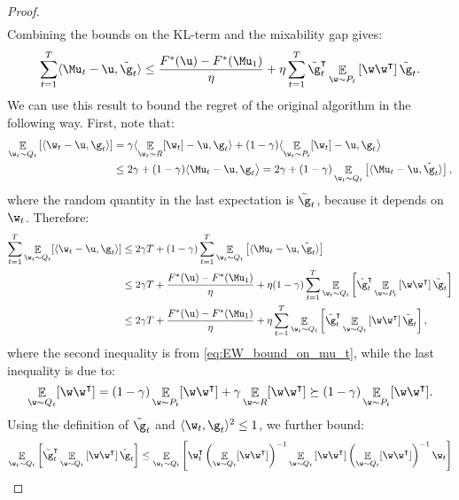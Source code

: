 \documentclass{colt2018} %
\DeclareMathOperator*{\E}{\mathbb{E}}
\renewcommand{\top}{\intercal}
\newcommand{\inner}[2]{\langle #1, #2 \rangle}  %
\begin{document}
\begin{proof}
\begin{align*}
\end{align*}
Combining the bounds on the KL-term and the mixability gap gives:
\begin{equation}
\sum_{t=1}^T \inner{\Mu_t - \u}{\tilde{\g}_t}
\leq \frac{F^*(\u) - F^*(\Mu_1)}{\eta} + \eta \sum_{t=1}^T 
 \tilde{\g}_t^\top \E_{\w \sim P_t} \left[\w \w^\top \right] \tilde{\g}_t.
\label{eq:EW_bound_on_mu_t}
\end{equation}
We can use this result to bound the regret of the original algorithm in the
following way. 
% 
First, note that:
\begin{align*}
  \E_{\w_t \sim Q_t} \left[ \inner{\w_t-\u}{\g_t} \right] 
% 
% 
&= \gamma \langle \E_{\w_t \sim R}[\w_t]-\u, \g_t\rangle
+ (1-\gamma) \langle \E_{\w_t \sim P_t}[\w_t] - \u, \g_t \big\rangle \\
&\leq 2\gamma + (1-\gamma) \langle \Mu_t - \u, \g_t \big\rangle 
=  2\gamma + (1-\gamma) \E_{\w_t \sim Q_t} \left[ \inner{\Mu_t-\u}{\tilde{\g}_t} \right],
\end{align*}
% 
where the random quantity in the last expectation is $\tilde{\g}_t$,
because it depends on $\w_t$.
% 
% 
% 
Therefore:
\begin{align}
\sum_{t=1}^T \E_{\w_t \sim Q_t} [\inner{\w_t - \u}{\g_t}]
&\leq 2 \gamma T + (1-\gamma) \sum_{t=1}^T \E_{\w_t \sim Q_t} 
\left[ \inner{\Mu_t-\u}{\tilde{\g}_t} \right] \nonumber \\
&\leq 2\gamma T + \frac{F^*(\u) - F^*(\Mu_1)}{\eta} +  \eta (1-\gamma)
\sum_{t=1}^T \E_{\w_t \sim Q_t} \left[\tilde{\g}_t^\top \E_{\w \sim P_t} \left[\w
\w^\top \right] \tilde{\g}_t \right] \nonumber \\
  &\leq 2\gamma T +  \frac{F^*(\u) - F^*(\Mu_1)}{\eta} + \eta
\sum_{t=1}^T \E_{\w_t \sim Q_t} \left[\tilde{\g}_t^\top \E_{\w \sim Q_t} \left[\w
\w^\top \right] \tilde{\g}_t \right],
\label{eq:intermediate_bound_on_quadratic_form}
\end{align}
where the second inequality is from \eqref{eq:EW_bound_on_mu_t},
while the last inequality is due to:
\[
  \E_{\w \sim Q_t}[\w\w^\top]
  = (1-\gamma) \E_{\w \sim P_t}[\w\w^\top] + \gamma \E_{\w \sim R}[\w\w^\top]
  \succeq (1-\gamma) \E_{\w \sim P_t}[\w\w^\top].
\]
% 
% 
% 
% 
Using the definition of $\tilde{\g}_t$ and $\inner{\w_t}{\g_t}^2 \leq
1$, we further bound:
\begin{align*}
  \E_{\w_t \sim Q_t} \left[ \tilde{\g}_t^\top \E_{\w \sim Q_t} \left[\w
\w^\top \right] \tilde{\g}_t \right] 
&\leq  \E_{\w_t \sim Q_t} \left[\w_t^\top \left(\E_{\w \sim Q_t}[\w\w^\top]\right)^{-1} \E_{\w \sim Q_t} \left[\w \w^\top \right] \left(\E_{\w \sim Q_t}[\w\w^\top]\right)^{-1} \w_t \right] \\

\end{align*}
\end{proof}
\end{document}

